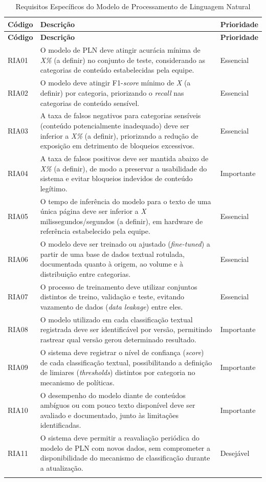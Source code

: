 \documentclass[
    12pt,           %
    oneside,        %
    a4paper,        %
    chapter=TITLE,  %
    english,        %
    brazil          %
]{abntex2}
\begin{document}
\begin{longtable}{|p{1.7cm}|p{9.8cm}|p{2.1cm}|}
\hline
\textbf{Código} & \textbf{Descrição} & \textbf{Prioridade} \\ \hline
\endfirsthead
\hline
\textbf{Código} & \textbf{Descrição} & \textbf{Prioridade} \\ \hline
\endhead

RIA01 & O modelo de PLN deve atingir acurácia mínima de \textit{X\%} (a definir) no conjunto de teste, considerando as categorias de conteúdo estabelecidas pela equipe. & Essencial \\ \hline
RIA02 & O modelo deve atingir F1-\textit{score} mínimo de \textit{X} (a definir) por categoria, priorizando o \textit{recall} nas categorias de conteúdo sensível. & Essencial \\ \hline
RIA03 & A taxa de falsos negativos para categorias sensíveis (conteúdo potencialmente inadequado) deve ser inferior a \textit{X\%} (a definir), priorizando a redução de exposição em detrimento de bloqueios excessivos. & Essencial \\ \hline
RIA04 & A taxa de falsos positivos deve ser mantida abaixo de \textit{X\%} (a definir), de modo a preservar a usabilidade do sistema e evitar bloqueios indevidos de conteúdo legítimo. & Importante \\ \hline
RIA05 & O tempo de inferência do modelo para o texto de uma única página deve ser inferior a \textit{X} milissegundos/segundos (a definir), em hardware de referência estabelecido pela equipe. & Essencial \\ \hline
RIA06 & O modelo deve ser treinado ou ajustado (\textit{fine-tuned}) a partir de uma base de dados textual rotulada, documentada quanto à origem, ao volume e à distribuição entre categorias. & Essencial \\ \hline
RIA07 & O processo de treinamento deve utilizar conjuntos distintos de treino, validação e teste, evitando vazamento de dados (\textit{data leakage}) entre eles. & Essencial \\ \hline
RIA08 & O modelo utilizado em cada classificação textual registrada deve ser identificável por versão, permitindo rastrear qual versão gerou determinado resultado. & Importante \\ \hline
RIA09 & O sistema deve registrar o nível de confiança (\textit{score}) de cada classificação textual, possibilitando a definição de limiares (\textit{thresholds}) distintos por categoria no mecanismo de políticas. & Importante \\ \hline
RIA10 & O desempenho do modelo diante de conteúdos ambíguos ou com pouco texto disponível deve ser avaliado e documentado, junto às limitações identificadas. & Importante \\ \hline
RIA11 & O sistema deve permitir a reavaliação periódica do modelo de PLN com novos dados, sem comprometer a disponibilidade do mecanismo de classificação durante a atualização. & Desejável \\ \hline

\caption{Requisitos Específicos do Modelo de Processamento de Linguagem Natural}
\label{tab:requisitos-ia}
\end{longtable}
\end{document}
